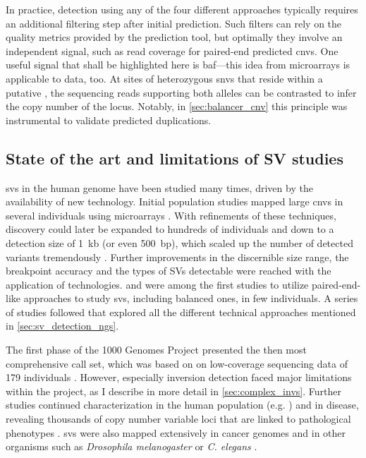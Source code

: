 In practice, \sv detection using any of the four different approaches typically
requires an additional filtering step after initial \sv prediction. Such
filters can rely on the quality metrics provided by the prediction tool, but
optimally they involve an independent signal, such as read coverage for
paired-end predicted \acp{cnv}. One useful signal that shall be highlighted here
is \acl{baf}---this idea from microarrays is applicable to \mps data,
too. At sites of heterozygous \acp{snv} that reside within a putative \sv, the
sequencing reads supporting both alleles can be contrasted to infer the copy
number of the locus. Notably, in \cref{sec:balancer_cnv} this principle was
instrumental to validate predicted duplications.





\subsection{State of the art and limitations of SV studies}
\label{sec:limitations}

\Aclp{sv} in the human genome have been studied many times, driven by the
availability of new technology. Initial population studies mapped large \acp{cnv}
in several individuals using microarrays \citep{Sebat2004,Iafrate2004,Sharp2005,Redon2006}.
With refinements of these techniques, \cnv discovery could later be expanded to
hundreds of individuals and down to a detection size of 1~kb (or even 500~bp),
which scaled up the number of detected variants tremendously
\citep{McCarroll2008,Conrad2010}. Further improvements in the discernible size
range, the breakpoint accuracy and the types of SVs detectable were reached
with the application of \mps technologies. \cite{Korbel2007} and \cite{Kidd2008}
were among the first studies to utilize paired-end-like approaches to study
\acp{sv}, including balanced ones, in few individuals. A series of studies
followed that explored all the different technical approaches mentioned in
\cref{sec:sv_detection_ngs}.

The first phase of the 1000 Genomes Project presented the then most
comprehensive \sv call set, which was based on on low-coverage sequencing data
of 179 individuals \citep{Mills2011}. However, especially inversion detection
faced major limitations within the project, as I describe in more detail in
\cref{sec:complex_invs}. Further studies continued \sv characterization in the
human population (e.g. \citep{Sudmant2015a,Hehir-Kwa2016}) and in disease,
revealing thousands of copy number variable loci that are linked to pathological
phenotypes \citep{Swaminathan2012,Forbes2011}. \Acp{sv} were also mapped extensively in
cancer genomes \citep{Weischenfeldt2016,Campbell2017} and in other organisms such
as \textit{Drosophila melanogaster} \citep{Massouras2012,Zichner2013} or
\textit{C. elegans} \citep{Maydan2010}.

